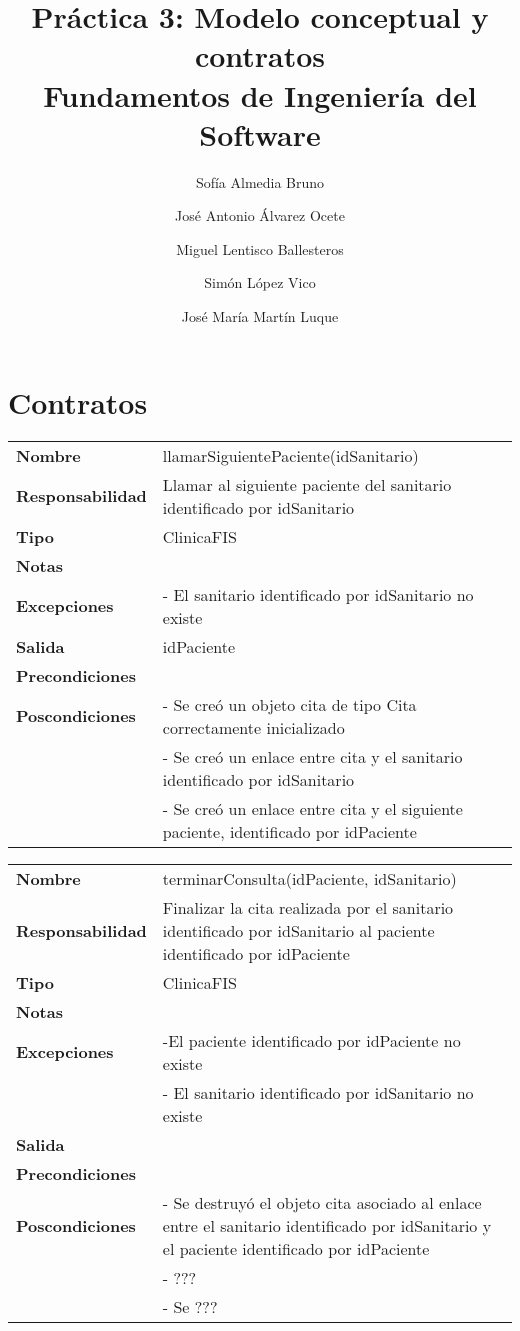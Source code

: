 \documentclass[11pt,a4paper]{article}
\title{Práctica 3: Modelo conceptual y contratos \large\\ Fundamentos de Ingeniería del Software}
\author{Sofía Almedia Bruno \and José Antonio Álvarez Ocete \and Miguel Lentisco Ballesteros \and Simón López Vico \and José María Martín Luque}
\begin{document}
\maketitle

\section{Contratos}

\begin{table}[H]
\centering
\label{my-label}
\begin{tabular}{l|l}
\textbf{Nombre}          & llamarSiguientePaciente(idSanitario) \\
\textbf{Responsabilidad} & Llamar al siguiente paciente del sanitario identificado por idSanitario \\
\textbf{Tipo}            & ClinicaFIS \\
\textbf{Notas}           &  \\
\textbf{Excepciones}     & - El sanitario identificado por idSanitario no existe \\
\textbf{Salida}          & idPaciente \\
\textbf{Precondiciones}  &  \\
\textbf{Poscondiciones}  & - Se creó un objeto cita de tipo Cita correctamente inicializado\\
 & - Se creó un enlace entre cita y el sanitario identificado por idSanitario\\
 & - Se creó un enlace entre cita y el siguiente paciente, identificado por idPaciente\\
\end{tabular}
\end{table}

\begin{table}[H]
\centering
\label{my-label}
\begin{tabular}{l|l}
\textbf{Nombre}          & terminarConsulta(idPaciente, idSanitario) \\
\textbf{Responsabilidad} & Finalizar la cita realizada por el sanitario identificado por idSanitario al paciente identificado por idPaciente\\
\textbf{Tipo}            & ClinicaFIS \\
\textbf{Notas}           &  \\
\textbf{Excepciones}     & -El paciente identificado por idPaciente no existe\\
& - El sanitario identificado por idSanitario no existe \\
\textbf{Salida}          &  \\
\textbf{Precondiciones}  &  \\
\textbf{Poscondiciones}  & - Se destruyó el objeto cita asociado al enlace entre el sanitario identificado por idSanitario y el paciente identificado por idPaciente\\
 & - ???\\
 & - Se ???\\
\end{tabular}
\end{table}
\end{document}
